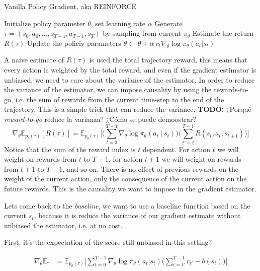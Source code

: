 \begin{algorithm}
    \caption{Vanilla Policy Gradient, aka REINFORCE}
    \begin{algorithmic}
    \STATE Initialize policy parameter $\theta$, set learning rate $\alpha$
    \STATE Generate $\tau=(s_0, a_0, ..., s_{T-1}, a_{T-1}, s_{T})$ by sampling from current $\pi_{\theta}$
        \STATE Estimate the return $R(\tau)$
        \STATE Update the policiy parameters $\theta \leftarrow \theta + \alpha~r_{t}\nabla_{\theta}\log\pi_{\theta}(a_{t}|s_{t})$
    \ENDFOR
    \end{algorithmic}
\end{algorithm}
A naive estimate of $R(\tau)$ is used the total trajectory reward, this means
that every action is weighted by the total reward, and even if the gradient
estimator is unbiased, we need to care about the variance of the estimator.
In order to reduce the variance of the estimator, we can impose causality
by using the rewards-to-go, i.e. the sum of rewards from the current time-step
to the end of the trajectory. This is a simple trick that can reduce the variance. \textbf{TODO:} ¿Porqué \textit{reward-to-go} reduce la varianza? ¿Cómo se puede
demoostrar?
\begin{equation}\label{eqn:reinforce-gradient-reward-to-go}
    \nabla_{\theta}\mathbb{E}_{p_{\theta}(\tau)}[R(\tau)] = \mathbb{E}_{p_{\theta}(\tau)}\bigg[\bigg(\sum_{t=0}^{T-1} \nabla_{\theta}\log \pi_{\theta} (a_t~|~s_t)\bigg) \bigg(\sum_{t'=t}^{T-1}R(s_{t}, a_{t}, s_{t+1})\bigg)\bigg] 
\end{equation}
Notice that the sum of the reward index is $t$ dependent. For action $t$ we 
will weight on rewards from $t$ to $T-1$, for action $t+1$ we will weight on
rewards from $t+1$ to $T-1$, and so on. There is no effect of previous rewards
on the weight of the current action, only the consequence of the current action
on the future rewards. This is the causality we want to impose in the gradient
estimator.

Lets come back to the \textit{baseline}, we want to use a baseline function
based on the current $s_{t}$, because it is reduce the variance of our gradient
estimate without unbiased the estimator, i.e. at no cost.

First, it's the expectation of the score still unbiased in this setting?

\begin{equation}\label{eqn:reinforce-gradient-estimator-baseline}
    \begin{split}
        \nabla_{\theta}\mathbb{E}_{\tau} &= \mathbb{E}_{p_{\theta}(\tau)} \bigg[\sum_{t=0}^{T-1}\nabla_{\theta}\log\pi_{\theta}(a_{t}|s_{t}) \bigg( \sum_{t=t'}^{T-1} r_{t'}-b(s_{t}) \bigg) \bigg]
    \end{split}
\end{equation}

